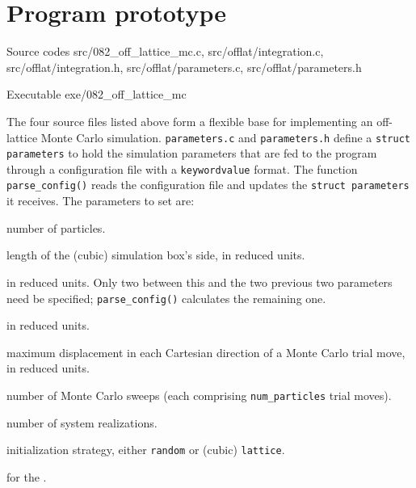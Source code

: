 \section{Program prototype}\label{ex:082}

\begin{sourcefiles}
  \item[Source codes] src/082\_off\_lattice\_mc.c, src/offlat/integration.c,
    src/offlat/integration.h, src/offlat/parameters.c, src/offlat/parameters.h
  \item[Executable] exe/082\_off\_lattice\_mc
\end{sourcefiles}

The four source files listed above form a flexible base for implementing an
off-lattice Monte Carlo simulation. \texttt{parameters.c} and
\texttt{parameters.h} define a \texttt{struct parameters} to hold the simulation
parameters that are fed to the program through a configuration file with a
\texttt{keyword\textvisiblespace value} format. The function
\texttt{parse\_config()} reads the configuration file and updates the
\texttt{struct parameters} it receives. The parameters to set are:
\begin{description}[font=\normalfont\ttfamily]
  \item[num\_particles] number of particles.
  \item[box\_size] length of the (cubic) simulation box's side, in reduced
    units.
  \item[density] in reduced units. Only two between this and the two
    previous two parameters need be specified; \texttt{parse\_config()}
    calculates the remaining one.
  \item[temperature] in reduced units.
  \item[max\_disp] maximum displacement in each Cartesian direction of a Monte
    Carlo trial move, in reduced units.
  \item[num\_steps] number of Monte Carlo sweeps (each comprising
    \texttt{num\_particles} trial moves).
  \item[num\_realizations] number of system realizations.
  \item[init\_conf] initialization strategy, either \texttt{random} or
    (cubic) \texttt{lattice}.
  \item[seed] for the .
\end{description}

